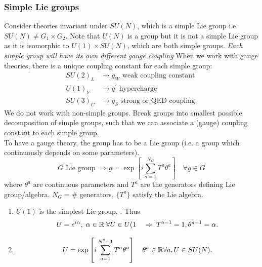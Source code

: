 \subsubsection{Simple Lie groups}
Consider theories invariant under $SU(N)$, which is a simple Lie group i.e. $SU(N) \neq G_1 \times G_2$. Note that $U(N)$ is a group but it is not a simple Lie group as it is isomorphic to $U(1)\times SU(N)$, which are both simple groups. \emph{Each simple group will have its own different gauge coupling} When we work with gauge theories, there is a unique coupling constant for each simple group:
\begin{align*}
	SU(2)_L& \rightarrow g_W \text{ weak coupling constant} \\
	U(1)_Y &\rightarrow g^\prime \text{ hypercharge}\\
	SU(3)_C & \rightarrow g_S \text{ strong or QED coupling}.
\end{align*}
We do not work with non-simple groups. Break groups into smallest possible decomposition of simple groups, such that we can associate a (gauge) coupling constant to each simple group.\\
To have a gauge theory, the group has to be a Lie group (i.e. a group which continuously depends on some parameters).
\begin{equation*}
	G \text{ Lie group } \Rightarrow g=\exp\left[i \sum_{a=1}^{N_G} T^a \theta^a\right] \quad \forall g\in G
\end{equation*}
where $\theta^a$ are continuous parameters and $T^a$ are the generators defining Lie group/algebra, $N_G=\#$ generators, $\{T^a\}$ satisfy the Lie algebra.
\begin{enumerate}
	\item $U(1)$ is the simplest Lie group, . Thus
	\begin{equation*}
U=e^{i\alpha}, \;\alpha \in \mathbb{R}\; \forall U \in U(1 \quad \Rightarrow \;T^{a=1}=1, \theta^{a=1} = \alpha.
	\end{equation*}
\item \begin{equation*}
	U=\exp\left[i\sum_{a=1}^{N^2-1} T^a \theta^a\right]  \quad \theta^a \in \mathbb{R} \forall a, U \in SU(N).
\end{equation*}
\end{enumerate}
